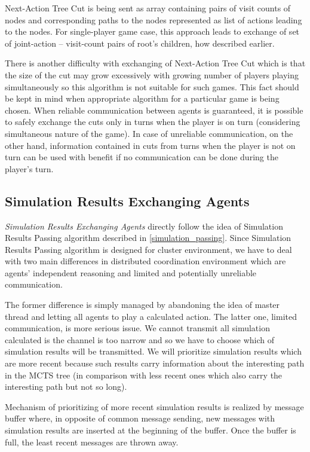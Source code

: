 Next-Action Tree Cut is being sent as array containing pairs of visit counts of nodes and
corresponding paths to the nodes represented as list of actions leading to the nodes. For
single-player game case, this approach leads to exchange of set of joint-action -- visit-count
pairs of root's children, how described earlier.

There is another difficulty with exchanging of Next-Action Tree Cut which is that the size of
the cut may grow excessively with growing number of players playing simultaneously so this 
algorithm is not suitable for such games. This fact should be kept in mind
when appropriate algorithm for a particular game is being chosen. When reliable communication
between agents is guaranteed, it is possible to safely exchange the cuts only in turns when the
player is on turn (considering simultaneous nature of the game). In case of unreliable
communication, on the other hand, information contained in cuts from turns when the player is
not on turn can be used with benefit if no communication can be done during the player's turn.


\subsection{Simulation Results Exchanging Agents}

\emph{Simulation Results Exchanging Agents} directly follow the idea of Simulation Results
Passing algorithm described in \ref{simulation_passing}. Since Simulation Results Passing
algorithm is designed for cluster environment, we have to deal with two main differences in
distributed coordination environment which are agents' independent reasoning and limited
and potentially unreliable communication. 

The former difference is simply managed by abandoning
the idea of master thread and letting all agents to play a calculated action. The latter one,
limited communication, is more serious issue. We cannot transmit all simulation calculated is
the channel is too narrow and so we have to choose which of simulation results will be
transmitted. We will prioritize simulation results which are more recent because such results
carry information about the interesting path in the MCTS tree (in comparison with less recent
ones which also carry the interesting path but not so long).

Mechanism of prioritizing of more recent simulation results is realized by message buffer
where, in opposite of common message sending, new messages with simulation results are inserted
at the beginning of the buffer. Once the buffer is full, the least recent messages are thrown
away.


